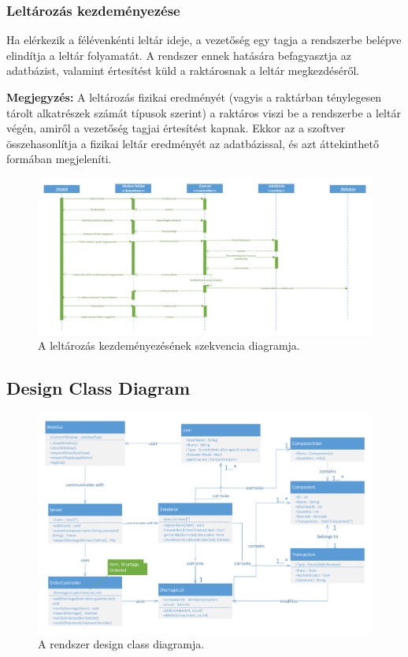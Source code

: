 \documentclass[12pt]{article}\usepackage[left=20mm,right=20mm,top=14mm,bottom=20mm]{geometry}
\begin{document}
\thispagestyle{empty}
\begin{landscape}
\subsubsection{Leltározás kezdeményezése}
Ha elérkezik a félévenkénti leltár ideje, a vezetőség egy tagja a rendszerbe belépve elindítja a leltár folyamatát. 
A rendszer ennek hatására befagyasztja az adatbázist, valamint értesítést küld a raktárosnak a leltár megkezdéséről. 
\vspace{5mm}

\noindent\textbf{Megjegyzés:} A leltározás fizikai eredményét (vagyis a raktárban ténylegesen tárolt alkatrészek számát típusok szerint) a raktáros viszi be a rendszerbe a leltár végén, amiről a vezetőség tagjai értesítést kapnak. 
Ekkor az a szoftver összehasonlítja a fizikai leltár eredményét az adatbázissal, és azt áttekinthető formában megjeleníti. 

\begin{figure}[!h]
    \centering
        \includegraphics[width=1.4\textwidth]{kepek/leltar_szekvencia.pdf}
        \caption{A leltározás kezdeményezésének szekvencia diagramja.}
\end{figure}
\end{landscape}

\thispagestyle{empty}
\begin{landscape}
\subsection{Design Class Diagram}
\begin{figure}[!h]
    \centering
        \includegraphics[width=1.3\textwidth]{kepek/dcd.pdf}
        \caption{A rendszer design class diagramja.}
\end{figure}
\end{landscape}
\end{document}
